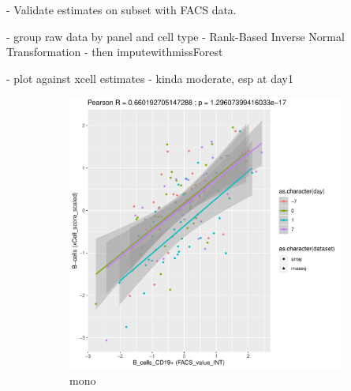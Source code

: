 - Validate estimates on subset with FACS data.

-    group raw data by panel and cell type
-    Rank-Based Inverse Normal Transformation
- then imputewithmissForest


- plot against xcell estimates
- kinda moderate, esp at day1

\begin{figure}
    \centering
    \begin{subfigure}[b]{0.43\textwidth}
        \centering
        \includegraphics[width=1.0\textwidth,page=6]{mainmatter/figures/chapter_03/validate_xCell_estimates.cell_type_pairs.pdf}
        \caption{mono}
    \end{subfigure}%
    \vspace{1em}\vfill%
    \begin{subfigure}[b]{0.43\textwidth}
        \centering

\end{subfigure}
\end{figure}
